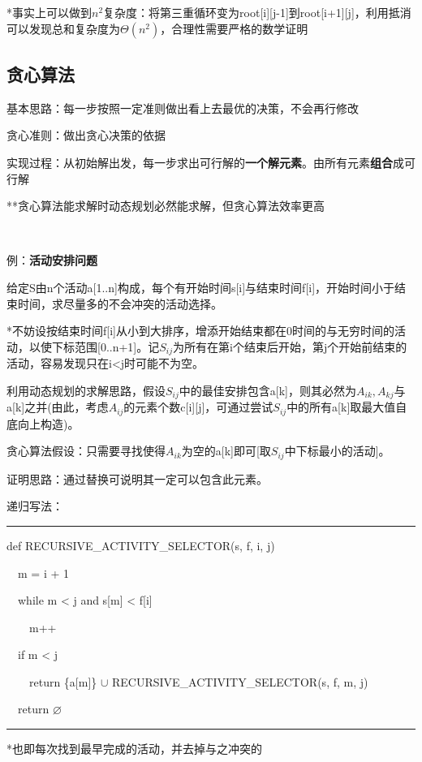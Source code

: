 \documentclass[a4paper,UTF8,fontset=windows]{ctexart}
\newenvironment{code}{\rule{36em}{0.1em}\setlength{\parindent}{1em}

}{

\setlength{\parindent}{0em}\rule{36em}{0.1em}}
\begin{document}
*\hspace{0em}事实上可以做到$n^2$复杂度：将第三重循环变为root[i][j-1]到root[i+1][j]，利用抵消可以发现总和复杂度为$\Theta(n^2)$，合理性需要严格的数学证明

\subsection{贪心算法}

基本思路：每一步按照一定准则做出看上去最优的决策，不会再行修改

贪心准则：做出贪心决策的依据

实现过程：从初始解出发，每一步求出可行解的\textbf{一个解元素}。由所有元素\textbf{组合}成可行解

**\hspace{0em}贪心算法能求解时动态规划必然能求解，但贪心算法效率更高

\

例：\textbf{活动安排问题}

给定S由n个活动a[1..n]构成，每个有开始时间s[i]与结束时间f[i]，开始时间小于结束时间，求尽量多的不会冲突的活动选择。

*\hspace{0em}不妨设按结束时间f[i]从小到大排序，增添开始结束都在0时间的与无穷时间的活动，以使下标范围[0..n+1]。记$S_{ij}$为所有在第i个结束后开始，第j个开始前结束的活动，容易发现只在i<j时可能不为空。

利用动态规划的求解思路，假设$S_{ij}$中的最佳安排包含a[k]，则其必然为$A_{ik},A_{kj}$与a[k]之并(由此，考虑$A_{ij}$的元素个数c[i][j]，可通过尝试$S_{ij}$中的所有a[k]取最大值自底向上构造)。

贪心算法假设：只需要寻找使得$A_{ik}$为空的a[k]即可[取$S_{ij}$中下标最小的活动]。

证明思路：通过替换可说明其一定可以包含此元素。

递归写法：

\begin{code}
def RECURSIVE\_ACTIVITY\_SELECTOR(s, f, i, j)

\ \ m = i + 1

\ \ while m < j and s[m] < f[i]

\ \ \ \ m++

\ \ if m < j

\ \ \ \ return \{a[m]\} $\cup$ RECURSIVE\_ACTIVITY\_SELECTOR(s, f, m, j)

\ \ return $\varnothing$

\end{code}

*\hspace{0em}也即每次找到最早完成的活动，并去掉与之冲突的
\end{document}

